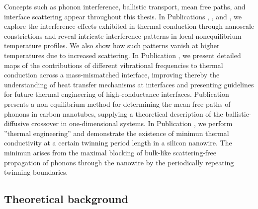 Concepts such as phonon interference, ballistic transport, mean free paths, and interface scattering appear throughout this thesis. In Publications , , and , we explore the interference effects exhibited in thermal conduction through nanoscale constrictions and reveal intricate interference patterns in local nonequilibrium temperature profiles. We also show how such patterns vanish at higher temperatures due to increased scattering. In Publication , we present detailed maps of the contributions of different vibrational frequencies to thermal conduction across a mass-mismatched interface, improving thereby the understanding of heat transfer mechanisms at interfaces and presenting guidelines for future thermal engineering of high-conductance interfaces. Publication  presents a non-equilibrium method for determining the mean free paths of phonons in carbon nanotubes, supplying a theoretical description of the ballistic-diffusive crossover in one-dimensional systems. In Publication , we perform ''thermal engineering'' and demonstrate the existence of minimun thermal conductivity at a certain twinning period length in a silicon nanowire. The minimun arises from the maximal blocking of bulk-like scattering-free propagation of phonons through the nanowire by the periodically repeating twinning boundaries.


\subsection{Theoretical background}


